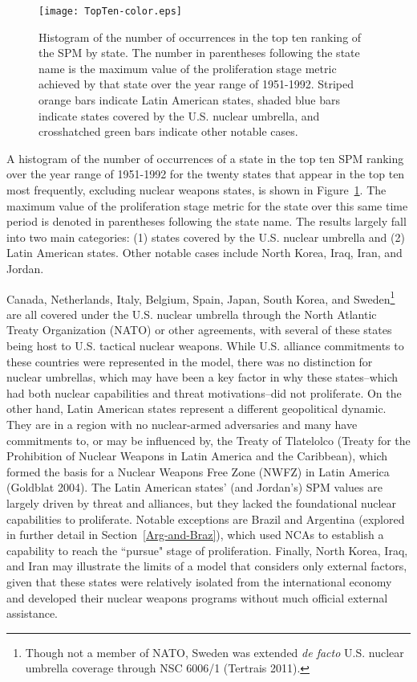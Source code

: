 \documentclass{article} %
\begin{document}
{\begin{figure}
  \centering
  \texttt{[image: TopTen-color.eps]}
  \caption{Histogram of the number of occurrences in the top ten ranking of the SPM by state. The number in parentheses following the state name is the maximum value of the proliferation stage metric achieved by that state over the year range of 1951-1992. Striped orange bars indicate Latin American states, shaded blue bars indicate states covered by the U.S. nuclear umbrella, and crosshatched green bars indicate other notable cases.}
  \label{fig:topten}
\end{figure}

A histogram of the number of occurrences of a state in the top ten SPM ranking over the year range of 1951-1992 for the twenty  states that appear in the top ten most frequently, excluding nuclear weapons states, is shown in Figure~\ref{fig:topten}. The maximum value of the proliferation stage metric for the state over this same time period is denoted in parentheses following the state name. The results largely fall into two main categories: (1) states covered by the U.S. nuclear umbrella and (2) Latin American states. Other notable cases include North Korea, Iraq, Iran, and Jordan.

Canada, Netherlands, Italy, Belgium, Spain, Japan, South Korea, and Sweden\footnote{Though not a member of NATO, Sweden was extended \textit{de facto} U.S. nuclear umbrella coverage through NSC 6006/1 (Tertrais 2011).} are all covered under the U.S. nuclear umbrella through the North Atlantic Treaty Organization (NATO) or other agreements, with several of these states being host to U.S. tactical nuclear weapons. While U.S. alliance commitments to these countries were represented in the model, there was no distinction for nuclear umbrellas, which may have been a key factor in why these states--which had both nuclear capabilities and threat motivations--did not proliferate. On the other hand, Latin American states represent a different geopolitical dynamic. They are in a region with no nuclear-armed adversaries and many have commitments to, or may be influenced by, the Treaty of Tlatelolco (Treaty for the Prohibition of Nuclear Weapons in Latin America and the Caribbean), which formed the basis for a Nuclear Weapons Free Zone (NWFZ) in Latin America (Goldblat 2004). The Latin American states' (and Jordan's) SPM values are largely driven by threat and alliances, but they lacked the foundational nuclear capabilities to proliferate. Notable exceptions are Brazil and Argentina (explored in further detail in Section~\ref{Arg-and-Braz}), which used NCAs to establish a capability to reach the ``pursue" stage of proliferation. Finally, North Korea, Iraq, and Iran may illustrate the limits of a model that considers only external factors, given that these states were relatively isolated from the international economy and developed their nuclear weapons programs without much official external assistance. 

}
\end{document}

